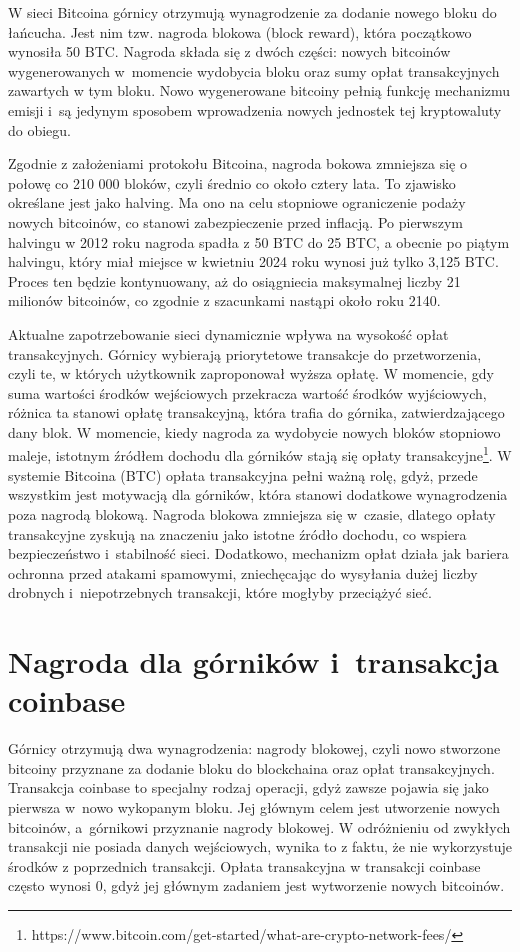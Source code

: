 \documentclass[12pt,a4paper]{report}
\theoremstyle{definition} %
\begin{document}
	W sieci Bitcoina górnicy otrzymują wynagrodzenie za dodanie nowego bloku do łańcucha. Jest nim tzw. nagroda blokowa (block reward), która początkowo wynosiła 50 BTC. Nagroda składa się z dwóch części: nowych bitcoinów wygenerowanych w~momencie wydobycia bloku oraz sumy opłat transakcyjnych zawartych w tym bloku. Nowo wygenerowane bitcoiny pełnią funkcję mechanizmu emisji i~są jedynym sposobem wprowadzenia nowych jednostek tej kryptowaluty do obiegu.

	Zgodnie z założeniami protokołu Bitcoina, nagroda bokowa zmniejsza się o połowę co 210 000 bloków, czyli średnio co około cztery lata. To zjawisko określane jest jako halving. Ma ono na celu stopniowe ograniczenie podaży nowych bitcoinów, co stanowi zabezpieczenie przed inflacją. Po pierwszym halvingu w 2012 roku nagroda spadła z 50 BTC do 25 BTC, a obecnie po piątym halvingu, który miał miejsce w kwietniu 2024 roku wynosi już tylko 3,125 BTC. Proces ten będzie kontynuowany, aż do osiągniecia maksymalnej liczby 21 milionów bitcoinów, co zgodnie z szacunkami nastąpi około roku 2140. 

	Aktualne zapotrzebowanie sieci dynamicznie wpływa na wysokość opłat transakcyjnych. Górnicy wybierają priorytetowe transakcje do przetworzenia, czyli te, w których użytkownik zaproponował wyższa opłatę. W momencie, gdy suma wartości środków wejściowych przekracza wartość środków wyjściowych, różnica ta stanowi opłatę transakcyjną, która trafia do górnika, zatwierdzającego dany blok. W momencie, kiedy nagroda za wydobycie nowych bloków stopniowo maleje, istotnym źródłem dochodu dla górników stają się opłaty transakcyjne\footnote{https://www.bitcoin.com/get-started/what-are-crypto-network-fees/}. W systemie Bitcoina (BTC) opłata transakcyjna pełni ważną rolę, gdyż, przede wszystkim jest motywacją dla górników, która stanowi dodatkowe wynagrodzenia poza nagrodą blokową. Nagroda blokowa zmniejsza się w~czasie, dlatego opłaty transakcyjne zyskują na znaczeniu jako istotne źródło dochodu, co wspiera bezpieczeństwo i~stabilność sieci. Dodatkowo, mechanizm opłat działa jak bariera ochronna przed atakami spamowymi, zniechęcając do wysyłania dużej liczby drobnych i~niepotrzebnych transakcji, które mogłyby przeciążyć sieć.

	\section{Nagroda dla górników i~transakcja coinbase}
	\hspace*{\parindent}Górnicy otrzymują dwa wynagrodzenia: nagrody blokowej, czyli nowo stworzone bitcoiny przyznane za dodanie bloku do blockchaina oraz opłat transakcyjnych. Transakcja coinbase to specjalny rodzaj operacji, gdyż zawsze pojawia się jako pierwsza w~nowo wykopanym bloku. Jej głównym celem jest utworzenie nowych bitcoinów, a~górnikowi przyznanie nagrody blokowej. W odróżnieniu od zwykłych transakcji nie posiada danych wejściowych, wynika to z faktu, że nie wykorzystuje środków z poprzednich transakcji. Opłata transakcyjna w transakcji coinbase często wynosi 0, gdyż jej głównym zadaniem jest wytworzenie nowych bitcoinów.
\end{document}
